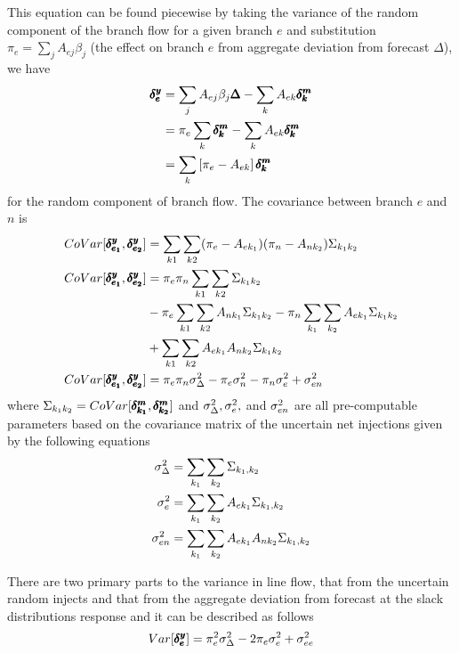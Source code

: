 This equation can be found piecewise by taking the variance of the random component of the branch flow for a given branch $e$ and substitution $\pi_e = \sum_j A_{ej} \beta_j$ (the effect on branch $e$ from aggregate deviation from forecast $\Delta$), we have
\begin{align*}
  \pmb{\delta^y_e} &= \sum_j A_{ej} \beta_j \pmb{\Delta} - \sum_k A_{ek} \pmb{\delta^m_k}\\
&= \pi_e \sum_k \pmb{\delta^m_k} - \sum_k A_{ek} \pmb{\delta^m_k}\\
&= \sum_k \left[ \pi_e  - A_{ek} \right] \pmb{\delta^m_k} 
\end{align*}
for the random component of branch flow. The covariance between branch $e$ and $n$ is
\begin{subequations}\label{covar_branch}
\begin{align}
CoVar[ \pmb{\delta^y_{e_1}},\pmb{\delta^y_{e_2}} ] &=  \sum_{k1} \sum_{k2} (\pi_{e} - A_{e k_1}) (\pi_{n} - A_{n k_2}) \Sigma_{k_1 k_2} \\
CoVar[ \pmb{\delta^y_{e_1}},\pmb{\delta^y_{e_2}} ] &=  \pi_{e} \pi_{n} \sum_{k1} \sum_{k2} \Sigma_{k_1 k_2} \\
& -  \pi_{e} \sum_{k1} \sum_{k2} A_{n k_1} \Sigma_{k_1 k_2} - \pi_{n} \sum_{k_1} \sum_{k_2} A_{e k_1} \Sigma_{k_1 k_2}   \\
&+ \sum_{k1} \sum_{k2} A_{e k_1} A_{n k_2} \Sigma_{k_1 k_2}  \\
CoVar[ \pmb{\delta^y_{e_1}},\pmb{\delta^y_{e_2}} ] &=  \pi_{e} \pi_{n} \sigma_\Delta^2 -  \pi_{e} \sigma_{n}^2 - \pi_{n} \sigma_{e}^2   + \sigma_{e n}^2
\end{align}
\end{subequations}
where $\Sigma_{k_1 k_2} = CoVar[ \pmb{\delta^m_{k_1}} ,\pmb{\delta^m_{k_2}} ]$ and  $\sigma_\Delta^2, \sigma_e^2,$ and $\sigma_{en}^2$ are all pre-computable parameters based on the covariance matrix of the uncertain net injections given by the following equations
\begin{subequations}
\begin{align}
 \sigma_\Delta^2 &= \sum_{k_1} \sum_{k_2} \Sigma_{k_1,k_2}  \\
 \sigma_e^2 &= \sum_{k_1} \sum_{k_2} A_{ek_1} \Sigma_{k_1,k_2} \\
 \sigma_{e n}^2 &= \sum_{k_1} \sum_{k_2} A_{e k_1} A_{n k_2} \Sigma_{k_1,k_2}
\end{align}
\end{subequations}


There are two primary parts to the variance in line flow, that from the uncertain random injects and that from the aggregate deviation from forecast at the slack distributions response and it can be described as follows  
\begin{equation}
Var[ \pmb{\delta^y_e} ] =  \pi_e^2  \sigma_\Delta^2  - 2 \pi_e \sigma_e^2  + \sigma_{ee}^2  
\end{equation}



